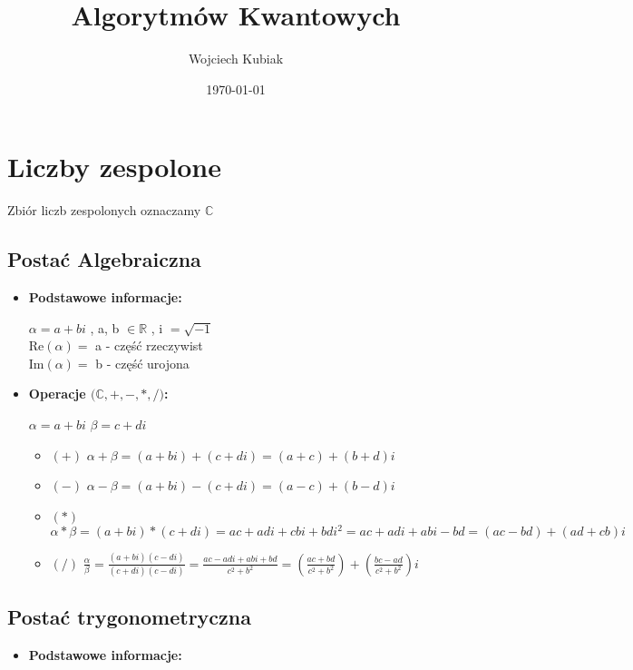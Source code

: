 \documentclass[12pt]{article}
\title{\textbf{Algorytmów Kwantowych}}
\author{Wojciech Kubiak}
\date{\today}
\begin{document}
\maketitle

\tableofcontents

\section{Liczby zespolone}
Zbiór liczb zespolonych oznaczamy $\mathds{C}$

\subsection{Postać Algebraiczna}
\begin{itemize}
    \item \textbf{Podstawowe informacje:}
    \begin{center}
        $\alpha = a + bi$ , \quad a, b $\in \mathds{R}$ , \quad i $= \sqrt{-1}$ \\
        Re$(\alpha) =$ a \quad - część rzeczywist \\
        Im$(\alpha) =$ b \quad - część urojona
    \end{center}
    \item \textbf{Operacje $\pmb(\mathds{C}, +, -, *, /)$:}
    \begin{center}
        $\alpha = a + bi$ \quad $\beta = c + di$
    \end{center}
    \begin{itemize}
        \item $(+)$ $\alpha + \beta = (a + bi) + (c + di) = (a + c) + (b + d)i$
        \item $(-)$ $\alpha - \beta = (a + bi) - (c + di) = (a - c) + (b - d)i$
        \item $(*)$ $\alpha * \beta = (a + bi) * (c + di) = ac + adi + cbi + bdi^2 = ac + adi + abi - bd = (ac - bd) + (ad + cb)i$
        \item $(/)$ $\frac{\alpha}{\beta} = \frac{(a+bi)(c-di)}{(c+di)(c-di)} = \frac{ac - adi + abi + bd}{c^2 + b^2} = (\frac{ac + bd}{c^2 + b^2}) + (\frac{bc - ad}{c^2 + b^2})i$
    \end{itemize}
\end{itemize}

\subsection{Postać trygonometryczna}
\begin{itemize}
    \item \textbf{Podstawowe informacje:}
\end{itemize}
\end{document}
